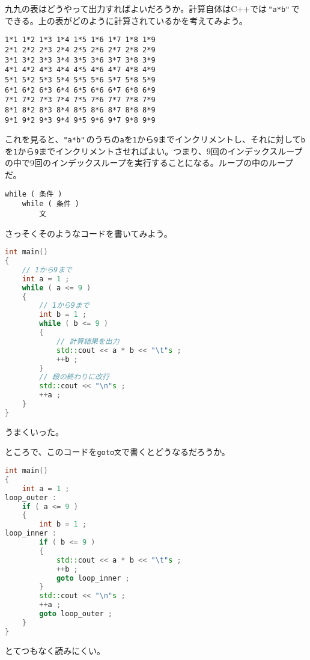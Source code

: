 九九の表はどうやって出力すればよいだろうか。計算自体はC++では\,\texttt{"a*b"}\,でできる。上の表がどのように計算されているかを考えてみよう。

\ifTombow\pagebreak\fi
\begin{lstlisting}[style=terminal]
1*1 1*2 1*3 1*4 1*5 1*6 1*7 1*8 1*9 
2*1 2*2 2*3 2*4 2*5 2*6 2*7 2*8 2*9 
3*1 3*2 3*3 3*4 3*5 3*6 3*7 3*8 3*9 
4*1 4*2 4*3 4*4 4*5 4*6 4*7 4*8 4*9 
5*1 5*2 5*3 5*4 5*5 5*6 5*7 5*8 5*9 
6*1 6*2 6*3 6*4 6*5 6*6 6*7 6*8 6*9 
7*1 7*2 7*3 7*4 7*5 7*6 7*7 7*8 7*9 
8*1 8*2 8*3 8*4 8*5 8*6 8*7 8*8 8*9 
9*1 9*2 9*3 9*4 9*5 9*6 9*7 9*8 9*9
\end{lstlisting}

これを見ると、\texttt{"a*b"}\,のうちの\texttt{a}を\texttt{1}から\texttt{9}までインクリメントし、それに対して\texttt{b}を\texttt{1}から\texttt{9}までインクリメントさせればよい。つまり、9回のインデックスループの中で9回のインデックスループを実行することになる。ループの中のループだ。

\begin{lstlisting}[style=grammar]
while ( 条件 )
    while ( 条件 )
        文
\end{lstlisting}

さっそくそのようなコードを書いてみよう。

\begin{lstlisting}[language={C++}]
int main()
{
    // 1から9まで
    int a = 1 ;
    while ( a <= 9 )
    {
        // 1から9まで
        int b = 1 ;
        while ( b <= 9 )
        {
            // 計算結果を出力
            std::cout << a * b << "\t"s ;
            ++b ;
        }
        // 段の終わりに改行
        std::cout << "\n"s ;
        ++a ;
    }
}
\end{lstlisting}

うまくいった。

ところで、このコードを\texttt{goto文}で書くとどうなるだろうか。

\ifTombow\pagebreak\fi
\begin{lstlisting}[language={C++}]
int main()
{
    int a = 1 ;
loop_outer :
    if ( a <= 9 )
    {
        int b = 1 ;
loop_inner :
        if ( b <= 9 )
        {
            std::cout << a * b << "\t"s ;
            ++b ;
            goto loop_inner ;
        }
        std::cout << "\n"s ;
        ++a ;
        goto loop_outer ;
    }
}
\end{lstlisting}

とてつもなく読みにくい。


